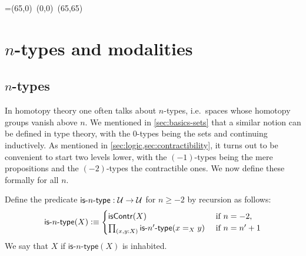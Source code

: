 \bgroup %

\newbox\pbbox
\setbox\pbbox=\hbox{\xy \POS(65,0)\ar@{-} (0,0) \ar@{-} (65,65)\endxy}
\def\pb{\save[]+<3.5mm,-3.5mm>*{\copy\pbbox} \restore}

\newcommand{\comp}[2]{\ensuremath{{#2} \circ {#1}}}
\newcommand{\contr}{\ensuremath{\mathsf{contr}}}
\newcommand{\istype}[1]{\mathsf{is}\mbox{-}{#1}\mbox{-}\mathsf{type}}
\newcommand{\nplusone}{\ensuremath{(n+1)}}
\newcommand{\nminusone}{\ensuremath{(n-1)}}

\renewcommand{\P}{\ensuremath{\mathsf{P}}\xspace}
\newcommand{\reflect}{\mathsf{r}}
\newcommand{\project}{\mathsf{p}}
\newcommand{\ext}{\mathsf{ext}}


\chapter{\texorpdfstring{$n$}{n}-types and modalities}
\label{cha:hlevels}

\section{$n$-types}

In homotopy theory one often talks about $n$-types, i.e.\ spaces whose homotopy groups vanish above $n$.
We mentioned in \autoref{sec:basics-sets} that a similar notion can be defined in type theory, with the $0$-types being the sets and continuing inductively.
As mentioned in \autoref{sec:logic,sec:contractibility}, it turns out to be convenient to start two levels lower, with the $(-1)$-types being the mere propositions and the $(-2)$-types the contractible ones.
We now define these formally for all $n$.

\begin{defn}\label{def:hlevel}
  Define the predicate $\istype{n} : \type \to \type$ for $n \geq -2$ by recursion as follows:
  \[ \istype{n}(X) \defeq
  \begin{cases}
    \iscontr(X) & \text{ if } n = -2 , \\
    \prd{x,y : X} \istype{n'}(\id[X]{x}{y}) & \text{ if } n = n'+1
  \end{cases}
  \]
  We say that $X$  if $\istype{n}(X)$ is inhabited.
\end{defn}


